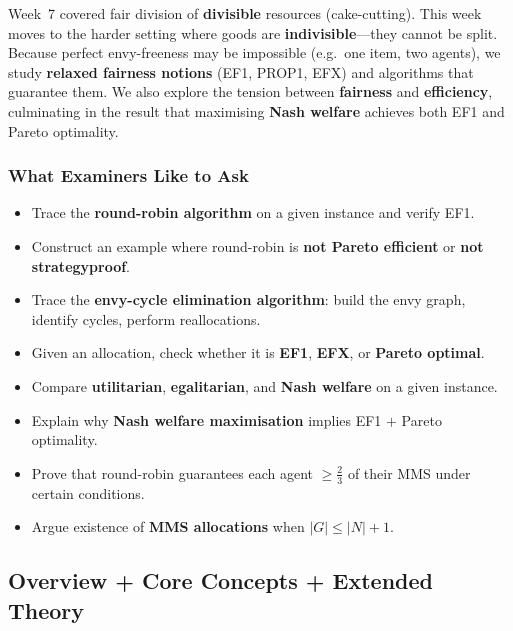 Week~7 covered fair division of \textbf{divisible} resources (cake-cutting). This week moves to the harder setting where goods are \textbf{indivisible}---they cannot be split. Because perfect envy-freeness may be impossible (e.g.\ one item, two agents), we study \textbf{relaxed fairness notions} (EF1, PROP1, EFX) and algorithms that guarantee them. We also explore the tension between \textbf{fairness} and \textbf{efficiency}, culminating in the result that maximising \textbf{Nash welfare} achieves both EF1 and Pareto optimality.

\separator

\subsubsection*{What Examiners Like to Ask}

\begin{itemize}
  \item Trace the \textbf{round-robin algorithm} on a given instance and verify EF1.
  \item Construct an example where round-robin is \textbf{not Pareto efficient} or \textbf{not strategyproof}.
  \item Trace the \textbf{envy-cycle elimination algorithm}: build the envy graph, identify cycles, perform reallocations.
  \item Given an allocation, check whether it is \textbf{EF1}, \textbf{EFX}, or \textbf{Pareto optimal}.
  \item Compare \textbf{utilitarian}, \textbf{egalitarian}, and \textbf{Nash welfare} on a given instance.
  \item Explain why \textbf{Nash welfare maximisation} implies EF1 $+$ Pareto optimality.
  \item Prove that round-robin guarantees each agent $\geq \frac{2}{3}$ of their MMS under certain conditions.
  \item Argue existence of \textbf{MMS allocations} when $|G| \leq |N| + 1$.
\end{itemize}

\separator

\subsection{Overview + Core Concepts + Extended Theory}

